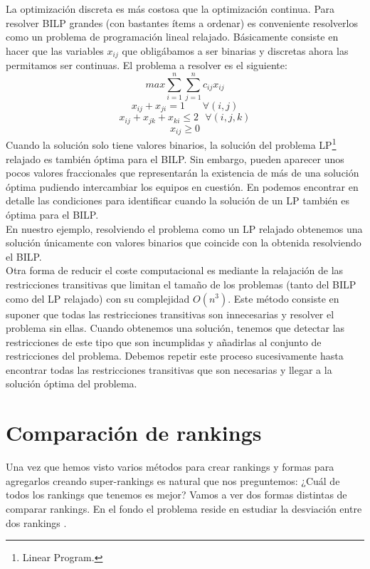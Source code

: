 La optimización discreta es más costosa que la optimización continua. Para resolver BILP grandes (con bastantes ítems a ordenar) es conveniente resolverlos como un problema de programación lineal relajado. Básicamente consiste en hacer que las variables $x_{ij}$ que obligábamos a ser binarias y discretas ahora las permitamos ser continuas. El problema a resolver es el siguiente:
\begin{equation} \label{optprob2}
	max \sum_{i=1}^{n} \sum_{j=1}^{n} c_{ij} x_{ij}
\end{equation}
\begin{equation*}
	x_{ij} + x_{ji} = 1 \ \ \ \ \ \ \ \ \forall (i,j)
\end{equation*}
\begin{equation*}
	x_{ij} + x_{jk} + x_{ki} \leq 2 \ \ \ \forall (i,j,k)
\end{equation*}
\begin{equation*}
	x_{ij} \geq 0
\end{equation*}
Cuando la solución solo tiene valores binarios, la solución del problema LP\footnote{Linear Program.} relajado es también óptima para el BILP. Sin embargo, pueden aparecer unos pocos valores fraccionales que representarán la existencia de más de una solución óptima pudiendo intercambiar los equipos en cuestión. En \cite[Chapter 4]{refbilp} podemos encontrar en detalle las condiciones para identificar cuando la solución de un LP también es óptima para el BILP.\\

En nuestro ejemplo, resolviendo el problema como un LP relajado obtenemos una solución únicamente con valores binarios que coincide con la obtenida resolviendo el BILP. \\

Otra forma de reducir el coste computacional es mediante la relajación de las restricciones transitivas que limitan el tamaño de los problemas (tanto del BILP como del LP relajado) con su complejidad $O(n^{3})$. Este método consiste en suponer que todas las restricciones transitivas son innecesarias y resolver el problema sin ellas. Cuando obtenemos una solución, tenemos que detectar las restricciones de este tipo que son incumplidas y añadirlas al conjunto de restricciones del problema. Debemos repetir este proceso sucesivamente hasta encontrar todas las restricciones transitivas que son necesarias y llegar a la solución óptima del problema.\\


\section{Comparación de rankings}
Una vez que hemos visto varios métodos para crear rankings y formas para agregarlos creando super-rankings es natural que nos preguntemos: ¿Cuál de todos los rankings que tenemos es mejor? Vamos a ver dos formas distintas de comparar rankings. En el fondo el problema reside en estudiar la desviación entre dos rankings \cite[Chapter 16]{libro_rankings}.

